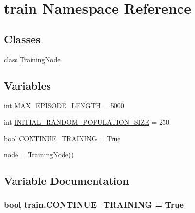 \hypertarget{namespacetrain}{}\section{train Namespace Reference}
\label{namespacetrain}
\subsection*{Classes}
\begin{DoxyCompactItemize}
\item 
class \hyperlink{classtrain_1_1_training_node}{Training\+Node}
\end{DoxyCompactItemize}
\subsection*{Variables}
\begin{DoxyCompactItemize}
\item 
int \hyperlink{namespacetrain_ad27ad66c4ffaa353cbb94c83a7968ce9}{M\+A\+X\+\_\+\+E\+P\+I\+S\+O\+D\+E\+\_\+\+L\+E\+N\+G\+TH} = 5000
\item 
int \hyperlink{namespacetrain_a4e23f5a2db715f6c10039c5ab27d4f44}{I\+N\+I\+T\+I\+A\+L\+\_\+\+R\+A\+N\+D\+O\+M\+\_\+\+P\+O\+P\+U\+L\+A\+T\+I\+O\+N\+\_\+\+S\+I\+ZE} = 250
\item 
bool \hyperlink{namespacetrain_ace8c65d5c0d8f68ac961d3a2bf198e5d}{C\+O\+N\+T\+I\+N\+U\+E\+\_\+\+T\+R\+A\+I\+N\+I\+NG} = True
\item 
\hyperlink{namespacetrain_a7c68a6981d3c74c76920e856fc7c2419}{node} = \hyperlink{classtrain_1_1_training_node}{Training\+Node}()
\end{DoxyCompactItemize}


\subsection{Variable Documentation}
\subsubsection[{\texorpdfstring{C\+O\+N\+T\+I\+N\+U\+E\+\_\+\+T\+R\+A\+I\+N\+I\+NG}{CONTINUE_TRAINING}}]{\setlength{\rightskip}{0pt plus 5cm}bool train.\+C\+O\+N\+T\+I\+N\+U\+E\+\_\+\+T\+R\+A\+I\+N\+I\+NG = True}\hypertarget{namespacetrain_ace8c65d5c0d8f68ac961d3a2bf198e5d}{}\label{namespacetrain_ace8c65d5c0d8f68ac961d3a2bf198e5d}


